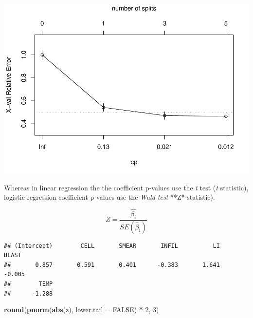 \documentclass[
]{book}
\newenvironment{Shaded}{\begin{snugshade}}{\end{snugshade}}
\newcommand{\DataTypeTok}[1]{\textcolor[rgb]{0.13,0.29,0.53}{#1}}
\newcommand{\DecValTok}[1]{\textcolor[rgb]{0.00,0.00,0.81}{#1}}
\newcommand{\KeywordTok}[1]{\textcolor[rgb]{0.13,0.29,0.53}{\textbf{#1}}}
\newcommand{\NormalTok}[1]{#1}
\newcommand{\OperatorTok}[1]{\textcolor[rgb]{0.81,0.36,0.00}{\textbf{#1}}}
\newcommand{\OtherTok}[1]{\textcolor[rgb]{0.56,0.35,0.01}{#1}}
\newcommand{\StringTok}[1]{\textcolor[rgb]{0.31,0.60,0.02}{#1}}
\begin{document}
\includegraphics{data-sci_files/figure-latex/unnamed-chunk-30-1.pdf}

Whereas in linear regression the the coefficient p-values use the \emph{t} test (\emph{t} statistic), logistic regression coefficient p-values use the \emph{Wald test} **Z*-statistic).

\[Z = \frac{\hat{\beta_i}}{SE(\hat{\beta}_i)}\]

\begin{Shaded}
\end{Shaded}

\begin{verbatim}
## (Intercept)        CELL       SMEAR       INFIL          LI       BLAST 
##       0.857       0.591       0.401      -0.383       1.641      -0.005 
##        TEMP 
##      -1.288
\end{verbatim}

\begin{Shaded}
\begin{Highlighting}[]
\KeywordTok{round}\NormalTok{(}\KeywordTok{pnorm}\NormalTok{(}\KeywordTok{abs}\NormalTok{(z), }\DataTypeTok{lower.tail =} \OtherTok{FALSE}\NormalTok{) }\OperatorTok{*}\StringTok{ }\DecValTok{2}\NormalTok{, }\DecValTok{3}\NormalTok{)}
\end{Highlighting}
\end{Shaded}
\end{document}
